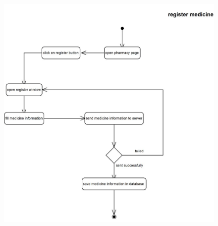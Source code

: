 \documentclass[]{article}
\begin{document}
\begin{figure}[H]
\centering
\includegraphics[scale=0.6]{./activity/02}
\end{figure}
\end{document}
